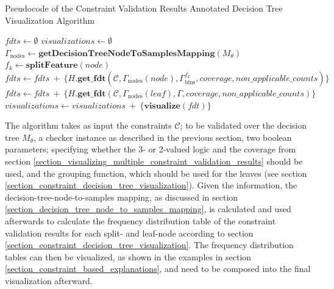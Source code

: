 \begin{algorithm}[H]
     \caption{Pseudocode of the Constraint Validation Results Annotated Decision Tree Visualization Algorithm}\label{algo:tree_visualization_algorithm}
     \begin{algorithmic}[1]
             \State $\textit{fdts} \gets \emptyset$
             \State $\textit{visualizations} \gets \emptyset$
             \State $\Gamma_\text{nodes} \gets \textbf{getDecisionTreeNodeToSamplesMapping}(M_\theta)$
              \label{algo:tree_visualization_algorithm:summary_start}
                \State $f_k \gets \textbf{splitFeature}(node)$
                \State $\textit{fdts} \gets \textit{fdts} ~+~  \{H.\textbf{get\_fdt}(\mathcal{C}, \Gamma_\text{nodes}(\textit{node}), \Gamma_\text{bins}^{f_k}, \textit{coverage}, \textit{non\_applicable\_counts})\}$
             \EndFor
                \State $\textit{fdts} \gets \textit{fdts} ~+~  \{H.\textbf{get\_fdt}(\mathcal{C}, \Gamma_\text{nodes}(\textit{leaf}), \Gamma, \textit{coverage}, \textit{non\_applicable\_counts})\}$
             \EndFor \label{algo:tree_visualization_algorithm:summary_end}
                 \State $\textit{visualizations} \gets \textit{visualizations} ~+~  \{\textbf{visualize}(\textit{fdt})\}$ \label{algo:tree_visualization_algorithm:visualize}
             \EndFor
             \State {} \label{algo:tree_visualization_algorithm:compose}
         \EndFunction
     \end{algorithmic}
\end{algorithm}

The algorithm takes as input the constraints $\mathcal{C}$; to be validated over the decision tree $M_\theta$, a checker instance as described in the previous section, two boolean parameters; specifying whether the 3- or 2-valued logic and the coverage from section \ref{section_visualizing_multiple_constraint_validation_results} should be used, and the grouping function, which should be used for the leaves (see section \ref{section_constraint_decision_tree_visualization}). Given the information, the decision-tree-node-to-samples mapping, as discussed in section \ref{section_decision_tree_node_to_samples_mapping}, is calculated and used afterwards to calculate the frequency distribution table of the constraint validation results for each split- and leaf-node according to section \ref{section_constraint_decision_tree_visualization}. 
The frequency distribution tables can then be visualized, as shown in the examples in section \ref{section_constraint_based_explanations}, and need to be composed into the final visualization afterward.

